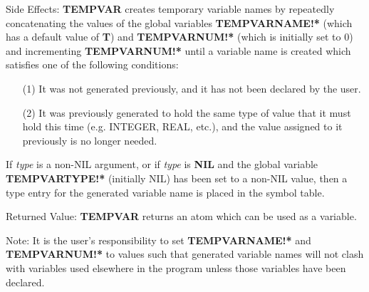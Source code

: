 \begin{describe}{Side Effects:}
{\bf TEMPVAR} creates temporary variable names by repeatedly concatenating
the values of the global variables {\bf TEMPVARNAME!*} (which has a
default value of {\bf T}) and {\bf TEMPVARNUM!*} (which is initially set
to 0) and incrementing {\bf TEMPVARNUM!*} until a variable name is created
which satisfies one of the following conditions:
\begin{itemize}
\item[{(1)}]
It was not generated previously, and it has not been declared by the user.
\item[{(2)}]
It was previously generated to hold the same type of value that it
must hold this time (e.g. INTEGER, REAL, etc.), and the value assigned
to it previously is no longer needed.
\end{itemize}
If {\it type} is a non-NIL argument, or if {\it type} is {\bf NIL}
and the global variable {\bf TEMPVARTYPE!*} (initially NIL) has been
set to a non-NIL value, then a type entry for the generated variable name
is placed in the symbol table.
\end{describe}
\begin{describe}{Returned Value:}
{\bf TEMPVAR} returns an atom which can be used as a variable.
\end{describe}
Note:  It is the user's responsibility to set {\bf TEMPVARNAME!*} and 
{\bf TEMPVARNUM!*} to values such that generated variable
names will not clash with variables used elsewhere in the
program unless those variables have been declared.

